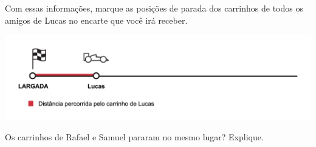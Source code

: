 \documentclass[10 pt,usenames,dvipsnames, oneside]{article}
\begin{document}
Com essas informações, marque as posições de parada dos carrinhos de todos os amigos de Lucas no encarte que você irá receber.

\begin{center}
\includegraphics[width=450pt, keepaspectratio]{ativ12_fig01.png}
\end{center}


Os carrinhos de Rafael e Samuel pararam no mesmo lugar? Explique.

\ifdefined\prof
\end{document}

